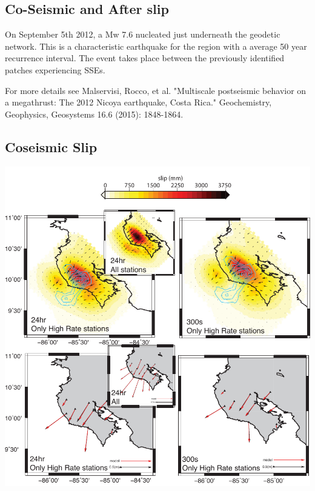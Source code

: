 \documentclass[a0,landscape]{a0poster}
\begin{document}
\begin{multicols}{5}
\section*{Co-Seismic and After slip}
\color{DarkSlateGray}
On September 5th 2012, a Mw 7.6 nucleated just underneath the geodetic network. This is a characteristic earthquake for the region with a average 50 year recurrence interval. The event takes place between the previously identified patches experiencing SSEs. 
\begin{footnotesize}
For more details see Malservisi, Rocco, et al. "Multiscale postseismic behavior on a megathrust: The 2012 Nicoya earthquake, Costa Rica." Geochemistry, Geophysics, Geosystems 16.6 (2015): 1848-1864.
\end{footnotesize}

\subsection*{Coseismic Slip}

\begin{center}\vspace{0.5cm}
	\includegraphics[width=17cm]{coseismic.pdf}
\end{center}\vspace{0.5cm}

\end{multicols}
\end{document}
